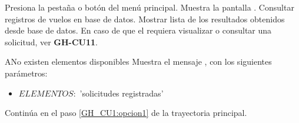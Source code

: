 \begin{UCtrayectoria}
	\UCpaso [\UCactor] Presiona la pestaña o botón 
	 del menú principal.
	\UCpaso Muestra la pantalla .
	\UCpaso \label{GH_CU1:opcion1} Consultar registros de vuelos en base de 
	datos. 
	\UCpaso Mostrar lista de los resultados obtenidos desde base de datos.
	\UCpaso En caso de que el  requiera visualizar o 
	consultar una solicitud, ver \textbf{GH-CU11}.
\end{UCtrayectoria}



\begin{UCtrayectoriaA}{A}{No existen elementos disponibles}
	\UCpaso Muestra el mensaje , con los siguientes 
	parámetros:
	\begin{itemize}
		\item $ELEMENTOS:$ 'solicitudes registradas'
	\end{itemize}
	\UCpaso Continúa en el paso \ref{GH_CU1:opcion1}  de la trayectoria 
	principal.
\end{UCtrayectoriaA}







